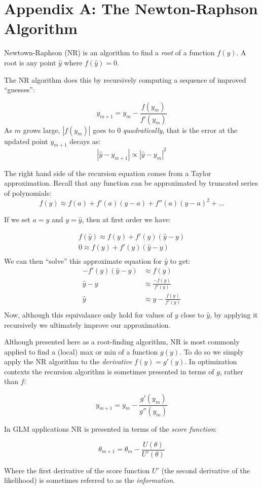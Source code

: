 \documentclass[
]{article}
\begin{document}
\hypertarget{appendix-a-the-newton-raphson-algorithm}{%
\section{Appendix A: The Newton-Raphson
Algorithm}\label{appendix-a-the-newton-raphson-algorithm}}

Newtown-Raphson (NR) is an algorithm to find a \emph{root} of a function
\(f(y)\). A root is any point \(\hat{y}\) where \(f(\hat{y})=0\).

The NR algorithm does this by recursively computing a sequence of
improved ``guesses'':

\[
y_{m+1} = y_m - \frac{f(y_m)}{f'(y_m)}
\] As \(m\) grows large, \(|f(y_m)|\) goes to 0 \emph{quadratically},
that is the error at the updated point \(y_{m+1}\) decays as: \[
|\hat{y} - y_{m+1}| \propto |\hat{y} - y_m|^2
\]

The right hand side of the recursion equation comes from a Taylor
approximation. Recall that any function can be approximated by truncated
series of polynomials: \[
f(y) \approx f(a) + f'(a)(y-a) + f''(a)(y-a)^2 + ...
\]

If we set \(a=y\) and \(y=\hat{y}\), then at first order we have:

\[
\begin{split}
f(\hat{y}) \approx f(y) + f'(y)(\hat{y}-y) \\
0 \approx f(y) + f'(y)(\hat{y}-y) \\
\end{split}
\] We can then ``solve'' this approximate equation for \(\hat{y}\) to
get: \[
\begin{split}
-f'(y)(\hat{y}-y) &\approx f(y)\\
\hat{y} - y &\approx \frac{-f(y)}{f'(y)}\\
\hat{y} &\approx y - \frac{f(y)}{f'(y)}\\
\end{split}
\] Now, although this equivalance only hold for values of \(y\) close to
\(\hat{y}\), by applying it recursively we ultimately improve our
approximation.

Although presented here as a root-finding algorithm, NR is most commonly
applied to find a (local) max or min of a function \(g(y)\). To do so we
simply apply the NR algorithm to the \emph{derivative} \(f(y) = g'(y)\).
In optimization contexts the recursion algorithm is sometimes presented
in terms of \(g\), rather than \(f\):

\[
y_{m+1} = y_m - \frac{g'(y_m)}{g''(y_m)}
\]

In GLM applications NR is presented in terms of the \emph{score
function}:

\[
\theta_{m+1} = \theta_m - \frac{U(\theta)}{U'(\theta)}
\]

Where the first derivative of the score function \(U'\) (the second
derivative of the likelihood) is sometimes referred to as the
\emph{information}.
\end{document}
